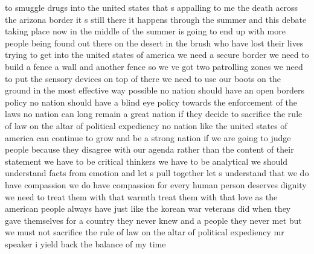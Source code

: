 \documentclass{article}
\begin{document}
to smuggle drugs into the united states that s appalling to me the death across the arizona border it s still there it happens through the summer and this debate taking place now in the middle of the summer is going to end up with more people being found out there on the desert in the brush who have lost their lives trying to get into the united states of america we need a secure border we need to build a fence a wall and another fence so we ve got two patrolling zones we need to put the sensory devices on top of there we need to use our boots on the ground in the most effective way possible no nation should have an open borders policy no nation should have a blind eye policy towards the enforcement of the laws no nation can long remain a great nation if they decide to sacrifice the rule of law on the altar of political expediency no nation like the united states of america can continue to grow and be a strong nation if we are going to judge people because they disagree with our agenda rather than the content of their statement we have to be critical thinkers we have to be analytical we should understand facts from emotion and let s pull together let s understand that we do have compassion we do have compassion for every human person deserves dignity we need to treat them with that warmth treat them with that love as the american people always have just like the korean war veterans did when they gave themselves for a country they never knew and a people they never met but we must not sacrifice the rule of law on the altar of political expediency mr speaker i yield back the balance of my time\pagebreak
\end{document}
